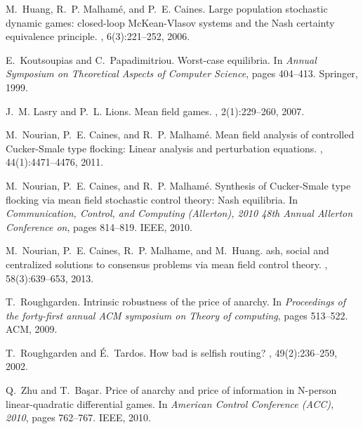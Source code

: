 \documentclass[11pt]{article}
\begin{document}
\begin{thebibliography}{10}
M.~Huang, R.~P. Malham{\'e}, and P.~E. Caines.
\newblock Large population stochastic dynamic games: closed-loop
  {M}c{K}ean-{V}lasov systems and the {N}ash certainty equivalence principle.
, 6(3):221--252, 2006.

E.~Koutsoupias and C.~Papadimitriou.
\newblock Worst-case equilibria.
\newblock In {\em Annual Symposium on Theoretical Aspects of Computer Science},
  pages 404--413. Springer, 1999.

J.~M. Lasry and P.~L. Lions.
\newblock Mean field games.
, 2(1):229--260, 2007.

M.~Nourian, P.~E. Caines, and R.~P. Malham{\'e}.
\newblock Mean field analysis of controlled {C}ucker-{S}male type flocking:
Linear analysis and perturbation equations.
, 44(1):4471--4476, 2011.

M.~Nourian, P.~E. Caines, and R.~P. Malham{\'e}.
\newblock Synthesis of {C}ucker-{S}male type flocking via mean field stochastic
  control theory: {N}ash equilibria.
\newblock In {\em Communication, Control, and Computing (Allerton), 2010 48th
  Annual Allerton Conference on}, pages 814--819. IEEE, 2010.

M.~Nourian, P.~E. Caines, R.~P. Malhame, and M.~Huang.
ash, social and centralized solutions to consensus problems via
  mean field control theory.
, 58(3):639--653, 2013.

T.~Roughgarden.
\newblock Intrinsic robustness of the price of anarchy.
\newblock In {\em Proceedings of the forty-first annual ACM symposium on Theory
  of computing}, pages 513--522. ACM, 2009.

T.~Roughgarden and {\'E}.~Tardos.
\newblock How bad is selfish routing?
, 49(2):236--259, 2002.

Q.~Zhu and T.~Ba{\c{s}}ar.
\newblock Price of anarchy and price of information in {N}-person
  linear-quadratic differential games.
\newblock In {\em American Control Conference (ACC), 2010}, pages 762--767.
  IEEE, 2010.

\end{thebibliography}
\end{document}
